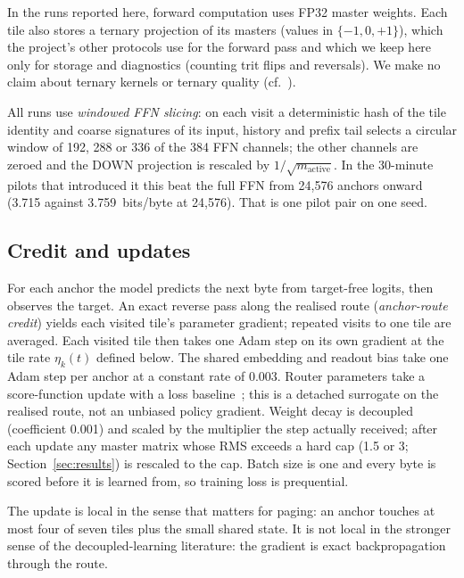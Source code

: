 \documentclass[10pt]{article}
\newcommand{\bpb}{bits/byte}
\begin{document}
In the runs reported here, forward computation uses FP32 master weights. Each tile also stores a
ternary projection of its masters (values in $\{-1,0,+1\}$), which the project's other protocols use
for the forward pass and which we keep here only for storage and diagnostics (counting trit flips
and reversals). We make no claim about ternary kernels or ternary quality
(cf.\ \citep{ma2024era,courbariaux2015binaryconnect}).

All runs use \emph{windowed FFN slicing}: on each visit a deterministic hash of the tile identity and
coarse signatures of its input, history and prefix tail selects a circular window of 192, 288 or
336 of the 384 FFN channels; the other channels are zeroed and the DOWN projection is rescaled by
$1/\sqrt{m_{\text{active}}}$. In the 30-minute pilots that introduced it this beat the full FFN from
24,576 anchors onward (3.715 against 3.759~\bpb{} at 24,576). That is one pilot pair on one seed.

\subsection{Credit and updates}
\label{sec:credit}

For each anchor the model predicts the next byte from target-free logits, then observes the target.
An exact reverse pass along the realised route (\emph{anchor-route credit}) yields each visited
tile's parameter gradient; repeated visits to one tile are averaged. Each visited tile then takes
one Adam step on its own gradient at the tile rate $\eta_k(t)$ defined below. The shared embedding
and readout bias take one Adam step per anchor at a constant rate of 0.003. Router parameters take a
score-function update with a loss baseline~\citep{williams1992reinforce}; this is a detached surrogate
on the realised route, not an unbiased policy gradient. Weight decay is decoupled~\citep{loshchilov2019adamw}
(coefficient 0.001) and scaled by the multiplier the step actually received; after each update any
master matrix whose RMS exceeds a hard cap (1.5 or 3; Section~\ref{sec:results}) is rescaled to the cap.
Batch size is one and every byte is scored before it is learned from, so training loss is
prequential.

The update is local in the sense that matters for paging: an anchor touches at most four of seven
tiles plus the small shared state. It is not local in the stronger sense of the decoupled-learning
literature: the gradient is exact backpropagation through the route.
\end{document}

